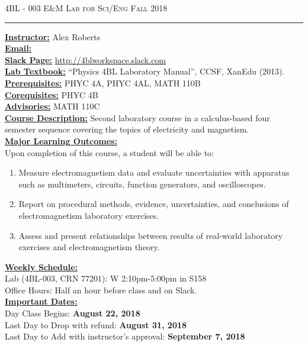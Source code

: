 \documentclass[12pt]{amsart}
\begin{document}
\thispagestyle{empty}

{\scshape 4BL - 003} \hfill {\scshape \large E\&M Lab for Sci/Eng} \hfill {\scshape Fall 2018}
 
\smallskip

\hrule

\bigskip

\textbf{\underline{Instructor:}} Alex Roberts\\
\textbf{\underline{Email:}}\\
\textbf{\underline{Slack Page:}} \url{http://4blworkspace.slack.com}\\
\textbf{\underline{Lab Textbook:}} “Physics 4BL Laboratory Manual”, CCSF, XanEdu (2013).\\
\textbf{\underline{Prerequisites:}} PHYC 4A, PHYC 4AL, MATH 110B\\
\textbf{\underline{Corequisites:}} PHYC 4B\\
\textbf{\underline{Advisories:}} MATH 110C\\
\textbf{\underline{Course Description:}} Second laboratory course in a calculus-based four semester sequence
covering the topics of electricity and magnetism.\\
\textbf{\underline{Major Learning Outcomes:}} \\ Upon completion of this course, a student will be able to:
\begin{enumerate}[label=(\Alph*)]
\item  Measure electromagnetism data and evaluate uncertainties with apparatus such as
multimeters, circuits, function generators, and oscilloscopes.
\item Report on procedural methods, evidence, uncertainties, and conclusions of electromagnetism laboratory exercises.
\item Assess and present relationships between results of real-world laboratory exercises
and electromagnetism theory.
\end{enumerate}
\textbf{\underline{Weekly Schedule:}}\\ 
Lab (4BL-003, CRN 77201): W 2:10pm-5:00pm in S158\\
Office Hours: Half an hour before class and on Slack.\\
\textbf{\underline{Important Dates:}}\\ 
Day Class Begins: \textbf{August 22, 2018}\\
Last Day to Drop with refund: \textbf{August 31, 2018}\\
Last Day to Add with instructor's approval: \textbf{September 7, 2018}\\
\end{document}
